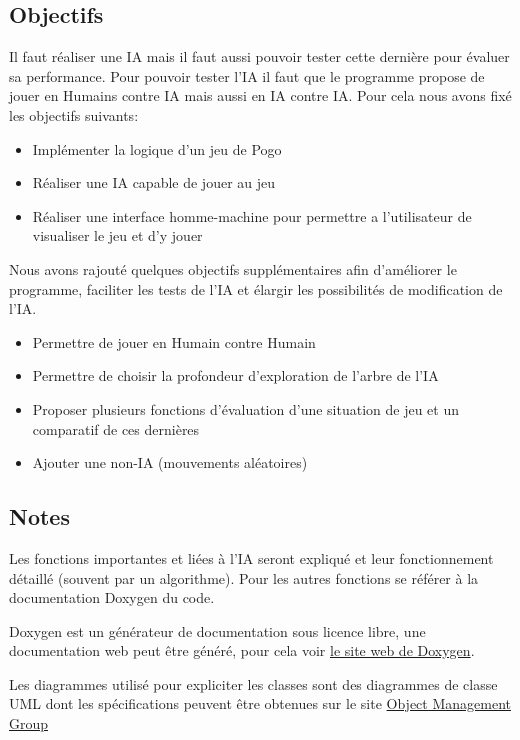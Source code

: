 \documentclass[article, backcover, french, nodocumentinfo]{upmethodology-document}
\begin{document}
		\subsection{Objectifs}
				Il faut réaliser une IA mais il faut aussi pouvoir tester cette dernière pour évaluer sa performance. Pour pouvoir tester l'IA il faut que le programme propose de jouer en Humains contre IA mais aussi en IA contre IA. Pour cela nous avons fixé les objectifs suivants:
				\begin{itemize}
					\item Implémenter la logique d'un jeu de Pogo
					\item Réaliser une IA capable de jouer au jeu
					\item Réaliser une interface homme-machine pour permettre a l'utilisateur de visualiser le jeu et d'y jouer
				\end{itemize}
				Nous avons rajouté quelques objectifs supplémentaires afin d'améliorer le programme, faciliter les tests de l'IA et élargir les possibilités de modification de l'IA.
				\begin{itemize}
					\item Permettre de jouer en Humain contre Humain
					\item Permettre de choisir la profondeur d'exploration de l'arbre de l'IA
					\item Proposer plusieurs fonctions d'évaluation d'une situation de jeu et un comparatif de ces dernières
					\item \color{green} Ajouter une non-IA (mouvements aléatoires)
				\end{itemize}
		\subsection{Notes}
				Les fonctions importantes et liées à l'IA seront expliqué et leur fonctionnement détaillé (souvent par un algorithme). Pour les autres fonctions se référer à la documentation Doxygen du code.
				\begin{upminfo}
					Doxygen est un générateur de documentation sous licence libre, une documentation web peut être généré, pour cela voir \href{http://www.stack.nl/~dimitri/doxygen/}{le site web de Doxygen}.
				\end{upminfo}
				Les diagrammes utilisé pour expliciter les classes sont des diagrammes de classe UML dont les spécifications peuvent être obtenues sur le site \href{http://www.omg.org/spec/UML/}{Object Management Group}
\end{document}
